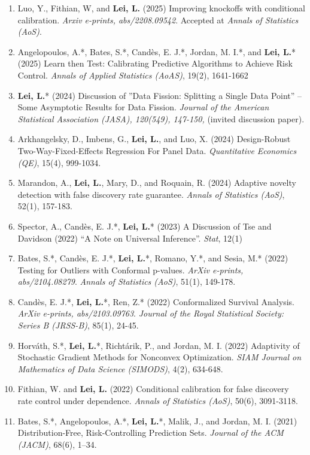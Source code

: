 \documentclass{article}
\begin{document}
\begin{enumerate}
\item {\color{red}Luo, Y., Fithian, W, and \textbf{Lei, L.} (2025) Improving knockoffs with conditional calibration. \emph{Arxiv e-prints, abs/2208.09542}. Accepted at \emph{Annals of Statistics (AoS)}.}  
\item Angelopoulos, A.*, Bates, S.*, Cand\`{e}s, E. J.*, Jordan, M. I.*, and \textbf{Lei, L.}* (2025) Learn then Test: Calibrating Predictive Algorithms to Achieve Risk Control. \emph{Annals of Applied Statistics (AoAS)}, 19(2), 1641-1662
\item \textbf{Lei, L.}* (2024) Discussion of ”Data Fission: Splitting a Single Data Point” – Some Asymptotic Results for Data Fission. \emph{Journal of the American Statistical Association (JASA), 120(549), 147-150,} (invited discussion paper).
\item Arkhangelsky, D., Imbens, G., \textbf{Lei, L.}, and Luo, X. (2024) Design-Robust Two-Way-Fixed-Effects Regression For Panel Data. \emph{Quantitative Economics (QE)}, 15(4), 999-1034.
\item Marandon, A., \textbf{Lei, L.}, Mary, D., and Roquain, R. (2024) Adaptive novelty detection with false discovery rate guarantee. \emph{Annals of Statistics (AoS)}, 52(1), 157-183.
\item Spector, A., Cand\`{e}s, E. J.*, \textbf{Lei, L.}* (2023) A Discussion of Tse and Davidson (2022) “A Note on Universal Inference”. \emph{Stat}, 12(1)
\item Bates, S.*, Cand\`{e}s, E. J.*, \textbf{Lei, L.}*, Romano, Y.*, and Sesia, M.* (2022) Testing for Outliers with Conformal p-values. \emph{ArXiv e-prints, abs/2104.08279}. \emph{Annals of Statistics (AoS)}, 51(1), 149-178.  
\item Cand\`{e}s, E. J.*, \textbf{Lei, L.}*, Ren, Z.* (2022) Conformalized Survival Analysis. \emph{ArXiv e-prints, abs/2103.09763}. \emph{Journal of the Royal Statistical Society: Series B (JRSS-B)}, 85(1), 24-45.
\item Horv\'{a}th, S.*, \textbf{Lei, L.}*, Richt\'{a}rik, P., and Jordan, M. I. (2022) Adaptivity of Stochastic Gradient Methods for Nonconvex Optimization. \emph{SIAM Journal on Mathematics of Data Science (SIMODS)}, 4(2), 634-648.
\item Fithian, W. and \textbf{Lei, L.} (2022) Conditional calibration for false discovery rate control under dependence. \emph{Annals of Statistics (AoS)}, 50(6), 3091-3118.
\item Bates, S.*, Angelopoulos, A.*, \textbf{Lei, L.}*, Malik, J., and Jordan, M. I. (2021) Distribution-Free, Risk-Controlling Prediction Sets. \emph{Journal of the ACM (JACM)}, 68(6), 1–34.

\end{enumerate}
\end{document}
